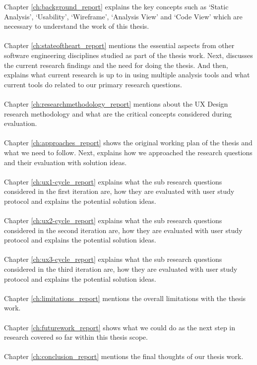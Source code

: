 \noindent Chapter \ref{ch:background_report} explains the key concepts such as ‘Static Analysis’, ‘Usability’, ‘Wireframe’, ‘Analysis View’ and ‘Code View’ which are necessary to understand the work of this thesis. \\ \\
Chapter \ref{ch:stateoftheart_report} mentions the essential aspects from other software engineering disciplines studied as part of the thesis work. Next, discusses the current research findings and the need for doing the thesis. And then, explains what current research is up to in using multiple analysis tools and what current tools do related to our primary research questions. \\ \\
Chapter \ref{ch:researchmethodology_report} mentions about the UX Design research methodology and what are the critical concepts considered during evaluation. \\ \\
Chapter \ref{ch:approaches_report} shows the original working plan of the thesis and what we need to follow. Next, explains how we approached the research questions and their evaluation with solution ideas. \\ \\
Chapter \ref{ch:ux1-cycle_report} explains what the sub research questions considered in the first iteration are, how they are evaluated with user study protocol and explains the potential solution ideas. \\ \\
Chapter \ref{ch:ux2-cycle_report} explains what the sub research questions considered in the second iteration are, how they are evaluated with user study protocol and explains the potential solution ideas. \\ \\
Chapter \ref{ch:ux3-cycle_report} explains what the sub research questions considered in the third iteration are, how they are evaluated with user study protocol and explains the potential solution ideas. \\ \\
Chapter \ref{ch:limitations_report} mentions the overall limitations with the thesis work. \\ \\
Chapter \ref{ch:futurework_report} shows what we could do as the next step in research covered so far within this thesis scope. \\ \\
Chapter \ref{ch:conclusion_report} mentions the final thoughts of our thesis work. \\ \\

\let\cleardoublepage\clearpage
